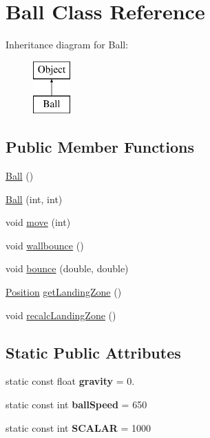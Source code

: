 \hypertarget{classBall}{\section{Ball Class Reference}
\label{classBall}
}
Inheritance diagram for Ball\-:\begin{figure}[H]
\begin{center}
\leavevmode
\includegraphics[height=2.000000cm]{classBall}
\end{center}
\end{figure}
\subsection*{Public Member Functions}
\begin{DoxyCompactItemize}
\item 
\hyperlink{classBall_a86a144d3dad6c953e422e32435923bbb}{Ball} ()
\item 
\hyperlink{classBall_a29d1cfd97f0bfddcbf86f5d71ed4a74a}{Ball} (int, int)
\item 
void \hyperlink{classBall_ae58dee698dec173afc66000b4660e949}{move} (int)
\item 
void \hyperlink{classBall_ac8bde2e98049adf194667e6a6505112d}{wallbounce} ()
\item 
void \hyperlink{classBall_a82ffc97c926776abe6f508eaa997214d}{bounce} (double, double)
\item 
\hyperlink{structPosition}{Position} \hyperlink{classBall_a77d822e70c4f55c2d0d514b76cb1330b}{get\-Landing\-Zone} ()
\item 
void \hyperlink{classBall_aa9efc8640cf5de6377caa0d64cc8fb13}{recalc\-Landing\-Zone} ()
\end{DoxyCompactItemize}
\subsection*{Static Public Attributes}
\begin{DoxyCompactItemize}
\item 
\hypertarget{classBall_af17d8911edff6e79ebf5c353d8643e00}{static const float {\bfseries gravity} = 0.}\label{classBall_af17d8911edff6e79ebf5c353d8643e00}

\item 
\hypertarget{classBall_a24bf806a98565f572173378c74043f41}{static const int {\bfseries ball\-Speed} = 650}\label{classBall_a24bf806a98565f572173378c74043f41}

\item 
\hypertarget{classBall_a82712fef17d72513e4dd92dff79c9765}{static const int {\bfseries S\-C\-A\-L\-A\-R} = 1000}\label{classBall_a82712fef17d72513e4dd92dff79c9765}

\end{DoxyCompactItemize}
